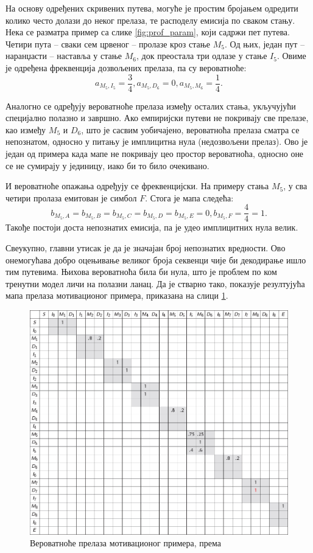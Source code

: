 \documentclass[12pt,oneside]{memoir}
\begin{document}
\begin{CJK}{UTF8}{ipxm}
На основу одређених скривених путева, могуће је простим бројањем одредити колико често долази до неког прелаза, те расподелу емисија по сваком стању. Нека се разматра пример са слике \ref{fig:prof_param}, који садржи пет путева. Четири пута -- сваки сем црвеног -- пролазе кроз стање $M_5$. Од њих, један пут -- наранџасти -- наставља у стање $M_6$, док преостала три одлазе у стање $I_5$. Овиме је одређена фреквенција дозвољених прелаза, па су вероватноће: $$a_{M_5, I_5} = \frac{3}{4}, a_{M_5, D_6} = 0, a_{M_5, M_6} = \frac{1}{4}.$$

Аналогно се одређују вероватноће прелаза између осталих стања, укључујући специјално полазно и завршно. Ако емпиријски путеви не покривају све прелазе, као између $M_5$ и $D_6$, што је сасвим уобичајено, вероватноћа прелаза сматра се непознатом, односно у питању је имплицитна нула (недозвољени прелаз). Ово је један од примера када мапе не покривају цео простор вероватноћа, односно оне се не сумирају у јединицу, иако би то било очекивано.

И вероватноће опажања одређују се фреквенцијски. На примеру стања $M_5$, у сва четири пролаза емитован је симбол $F$. Стога је мапа следећа: $$b_{M_5, A} = b_{M_5, B} = b_{M_5, C} = b_{M_5, D}= b_{M_5, E} = 0, b_{M_5, F} = \frac{4}{4} = 1.$$ Такође постоји доста непознатих емисија, па је удео имплицитних нула велик.

Свеукупно, главни утисак је да је значајан број непознатих вредности. Ово онемогућава добро оцењивање великог броја секвенци чије би декодирање ишло тим путевима. Њихова вероватноћа била би нула, што је проблем по ком тренутни модел личи на полазни ланац. Да је стварно тако, показује резултујућа мапа прелаза мотивационог примера, приказана на слици \ref{fig:prelazi}.

\begin{figure}[H]
  \centering
  \includegraphics[width=\textwidth]{prelazi.png}
  \caption{Вероватноће прелаза мотивационог примера, према \cite{compeau2015}}
  \label{fig:prelazi}
\end{figure}


\end{CJK}
\end{document}
